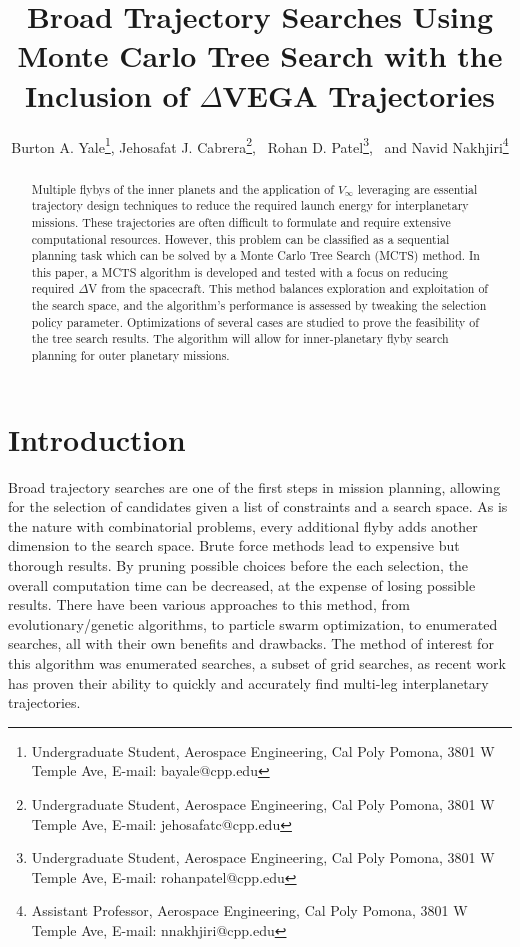 \documentclass[letterpaper, preprint, paper,11pt]{AAS}	%
\begin{document}
\title{Broad Trajectory Searches Using Monte Carlo Tree Search with the Inclusion of $\Delta$VEGA Trajectories}

\author{Burton A. Yale\thanks{Undergraduate Student, Aerospace Engineering, Cal Poly Pomona, 3801 W Temple Ave, E-mail: bayale@cpp.edu},  
Jehosafat J. Cabrera\thanks{Undergraduate Student, Aerospace Engineering, Cal Poly Pomona, 3801 W Temple Ave, E-mail: jehosafatc@cpp.edu},
\ Rohan D. Patel\thanks{Undergraduate Student, Aerospace Engineering, Cal Poly Pomona, 3801 W Temple Ave, E-mail: rohanpatel@cpp.edu},
\ and Navid Nakhjiri\thanks{Assistant Professor, Aerospace Engineering, Cal Poly Pomona, 3801 W Temple Ave, E-mail: nnakhjiri@cpp.edu}
}


\maketitle{} 		


\begin{abstract}
Multiple flybys of the inner planets and the application of $V_{\infty}$ leveraging are essential trajectory design techniques to reduce the required launch energy for interplanetary missions. These trajectories are often difficult to formulate and require extensive computational resources. However, this problem can be classified as a sequential planning task which can be solved by a Monte Carlo Tree Search (MCTS) method. In this paper, a MCTS algorithm is developed and tested with a focus on reducing required $\Delta$V from the spacecraft. This method balances exploration and exploitation of the search space, and the algorithm’s performance is assessed by tweaking the selection policy parameter. Optimizations of several cases are studied to prove the feasibility of the tree search results. The algorithm will allow for inner-planetary flyby search planning for outer planetary missions.
\end{abstract}

\section{Introduction}
Broad trajectory searches are one of the first steps in mission planning, allowing for the selection of candidates given a list of constraints and a search space. As is the nature with combinatorial problems, every additional flyby adds another dimension to the search space. Brute force methods lead to expensive but thorough results. By pruning possible choices before the each selection, the overall computation time can be decreased, at the expense of losing possible results. There have been various approaches to this method, from evolutionary/genetic algorithms, to particle swarm optimization, to enumerated searches, all with their own benefits and drawbacks. The method of interest for this algorithm was enumerated searches, a subset of grid searches, as recent work has proven their ability to quickly and accurately find multi-leg interplanetary trajectories\cite{Hennes2015}.
\end{document}
